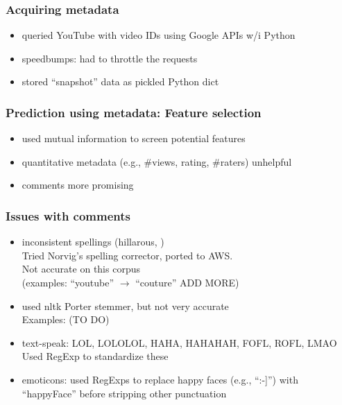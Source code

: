 \documentclass[fleqn]{beamer}
\begin{document}
\begin{frame}
\frametitle{Acquiring metadata}
   \begin{itemize}
       \item queried YouTube with video IDs using Google APIs w/i Python
       \item speedbumps: had to throttle the requests
       \item stored ``snapshot'' data as pickled Python dict
   \end{itemize}
\end{frame}

\begin{frame}
\frametitle{Prediction using metadata: Feature selection}
      \begin{itemize}
          \item used mutual information to screen potential features
          \item quantitative metadata (e.g., \#views, rating, \#raters) unhelpful
          \item comments more promising
      \end{itemize}

\end{frame}

\begin{frame}
\frametitle{Issues with comments}
    \begin{itemize}
        \item inconsistent spellings (hillarous, \textellipsis)\\
                Tried Norvig's spelling corrector, ported to AWS. \\
                Not accurate on this corpus\\
                  (examples: ``youtube'' $\rightarrow$ ``couture'' ADD MORE)

        \item used nltk Porter stemmer, but not very accurate\\
                   Examples: (TO DO)

        \item text-speak:  LOL, LOLOLOL, HAHA, HAHAHAH, FOFL, ROFL, LMAO\\
                 Used RegExp to standardize these

        \item emoticons: used RegExps to replace happy faces (e.g., ``:-]'') with ``happyFace'' 
                  before stripping other punctuation

    \end{itemize}
\end{frame}
\end{document}
